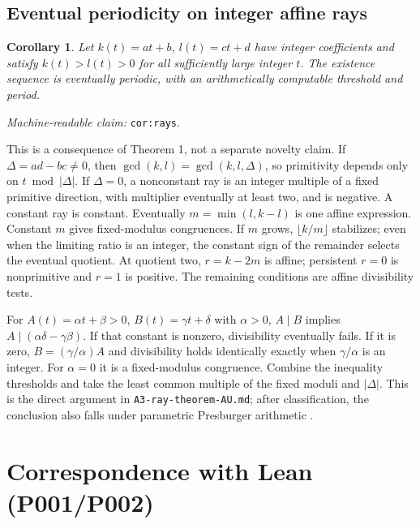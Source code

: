 \documentclass[11pt]{amsart}
\newcommand{\record}[1]{\nolinkurl{#1}}
\newtheorem{corollary}[theorem]{Corollary}
\newcommand{\claimid}[1]{\par\nopagebreak\noindent\textit{Machine-readable claim:} \record{#1}.\par}
\begin{document}
\subsection{Eventual periodicity on integer affine rays}
\begin{corollary}\label{cor:rays}
Let $k(t)=at+b$, $l(t)=ct+d$ have integer coefficients and satisfy
$k(t)>l(t)>0$ for all sufficiently large integer $t$. The existence
sequence is eventually periodic, with an arithmetically computable
threshold and period.
\end{corollary}
\claimid{cor:rays}
This is a consequence of Theorem 1, not a separate novelty claim.
If $\Delta=ad-bc\ne0$, then
$\gcd(k,l)=\gcd(k,l,\Delta)$, so primitivity depends only on
$t\bmod|\Delta|$. If $\Delta=0$, a nonconstant ray is an integer
multiple of a fixed primitive direction, with multiplier eventually
at least two, and is negative. A constant ray is constant.
Eventually $m=\min(l,k-l)$ is one affine expression. Constant $m$
gives fixed-modulus congruences. If $m$ grows, $\lfloor k/m\rfloor$
stabilizes; even when the limiting ratio is an integer, the constant
sign of the remainder selects the eventual quotient. At quotient two,
$r=k-2m$ is affine; persistent $r=0$ is nonprimitive and $r=1$ is
positive. The remaining conditions are affine divisibility tests.

For $A(t)=\alpha t+\beta>0$, $B(t)=\gamma t+\delta$ with
$\alpha>0$, $A\mid B$ implies $A\mid(\alpha\delta-\gamma\beta)$.
If that constant is nonzero, divisibility eventually fails. If it is
zero, $B=(\gamma/\alpha)A$ and divisibility holds identically exactly
when $\gamma/\alpha$ is an integer. For $\alpha=0$ it is a
fixed-modulus congruence. Combine the inequality thresholds and take
the least common multiple of the fixed moduli and $|\Delta|$.
This is the direct argument in \record{A3-ray-theorem-AU.md}; after
classification, the conclusion also falls under parametric Presburger
arithmetic \cite{BGW}.

\section{Correspondence with Lean (P001/P002)}\label{sec:lean}
\end{document}
